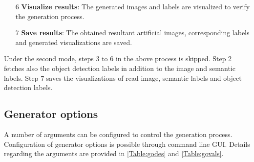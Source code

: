 \documentclass[paper=a4,11pt,parskip=half,toc=listof]{scrartcl}
\begin{document}
\begin{itemize}
		\item[6] \textbf{Visualize results}: The generated images and labels are visualized to verify the generation process.
		\item[7] \textbf{Save results}: The obtained resultant artificial images, corresponding labels and generated visualizations are saved.
	\end{itemize}
	
Under the second mode, steps 3 to 6 in the above process is skipped. Step 2 fetches also the object detection labels in addition to the image and semantic labels. Step 7 saves the visualizations of read image, semantic labels and object detection labels.
		

\subsection{Generator options}

A number of arguments can be configured to control the generation process. Configuration of generator options is possible through command line GUI. Details regarding the arguments are provided in \ref{Table:godes} and \ref{Table:govals}. 
\end{document}
